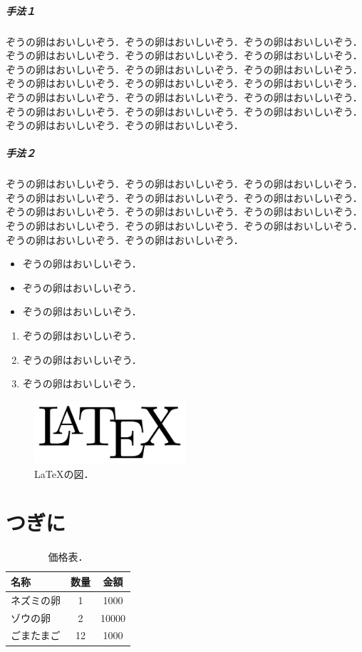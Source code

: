 \documentclass[
	10pt,
	a4j,		%
	twocolumn,	%
	uplatex
]{jsarticle}
\begin{document}
\subparagraph{手法１}
ぞうの卵はおいしいぞう．ぞうの卵はおいしいぞう．ぞうの卵はおいしいぞう．ぞうの卵はおいしいぞう．ぞうの卵はおいしいぞう．ぞうの卵はおいしいぞう．ぞうの卵はおいしいぞう．ぞうの卵はおいしいぞう．ぞうの卵はおいしいぞう．ぞうの卵はおいしいぞう．ぞうの卵はおいしいぞう．ぞうの卵はおいしいぞう．ぞうの卵はおいしいぞう．ぞうの卵はおいしいぞう．ぞうの卵はおいしいぞう．ぞうの卵はおいしいぞう．ぞうの卵はおいしいぞう．ぞうの卵はおいしいぞう．ぞうの卵はおいしいぞう．ぞうの卵はおいしいぞう．

\subparagraph{手法２}
ぞうの卵はおいしいぞう．ぞうの卵はおいしいぞう．ぞうの卵はおいしいぞう．ぞうの卵はおいしいぞう．ぞうの卵はおいしいぞう．ぞうの卵はおいしいぞう．ぞうの卵はおいしいぞう．ぞうの卵はおいしいぞう．ぞうの卵はおいしいぞう．ぞうの卵はおいしいぞう．ぞうの卵はおいしいぞう．ぞうの卵はおいしいぞう．ぞうの卵はおいしいぞう．ぞうの卵はおいしいぞう．

\begin{itemize}
	\item ぞうの卵はおいしいぞう．
	\item ぞうの卵はおいしいぞう．
	\item ぞうの卵はおいしいぞう．
\end{itemize}
\begin{enumerate}
	\item ぞうの卵はおいしいぞう．
	\item ぞうの卵はおいしいぞう．
	\item ぞうの卵はおいしいぞう．
\end{enumerate}

\begin{figure}[t]
	\centering
	\includegraphics[clip,width=0.5\textwidth]{fig/LaTeX.pdf}
	\caption{
		\LaTeX{}の図．
		\label{fig:latex}
	}
\end{figure}

\section{つぎに}
\begin{table}[t]
	\centering
	\caption{
		価格表．
		\label{tab:egg}
	}
	\begin{tabular}{l|cS[table-format=5.0]} %
		\toprule
		名称    &   数量  &   金額 \\
		\midrule
		ネズミの卵   &   1    &   1000 \\
		ゾウの卵   &   2    &   10000 \\
		ごまたまご &	12 & 1000 \\
		\bottomrule
	\end{tabular}
\end{table}
\end{document}
